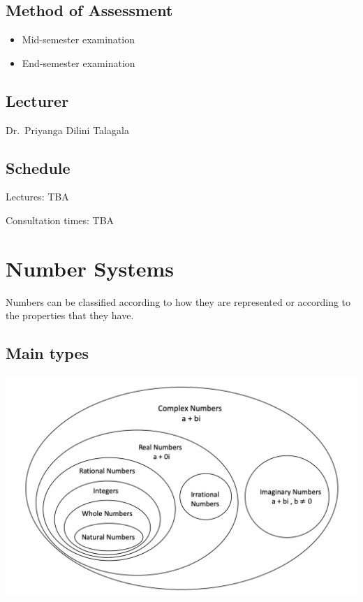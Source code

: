 \documentclass[]{book}
\providecommand{\tightlist}{%
  \setlength{\itemsep}{0pt}\setlength{\parskip}{0pt}}
\begin{document}
\hypertarget{method-of-assessment}{%
\section*{Method of Assessment}\label{method-of-assessment}}

\begin{itemize}
\tightlist
\item
  Mid-semester examination
\item
  End-semester examination
\end{itemize}

\hypertarget{lecturer}{%
\section*{Lecturer}\label{lecturer}}

Dr.~Priyanga Dilini Talagala

\hypertarget{schedule}{%
\section*{Schedule}\label{schedule}}

Lectures: TBA

Consultation times: TBA

\hypertarget{number-systems}{%
\chapter{Number Systems}\label{number-systems}}

Numbers can be classified according to how they are represented or according to the properties that they have.

\hypertarget{main-types}{%
\section{Main types}\label{main-types}}

\begin{center}\includegraphics[width=1\linewidth]{figure/1-numbertypes} \end{center}
\end{document}
